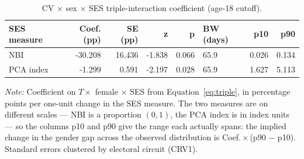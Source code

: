 \begin{table}
\caption{CV $\times$ sex $\times$ SES triple-interaction coefficient (age-18 cutoff).}
\label{tab:triple_T18}
\begin{tabular}{lrrrrlrr}
\toprule
SES measure & Coef. (pp) & SE (pp) & z & p & BW (days) & p10 & p90 \\
\midrule
NBI & -30.208 & 16.436 & -1.838 & 0.066 & 65.9 & 0.026 & 0.134 \\
PCA index & -1.299 & 0.591 & -2.197 & 0.028 & 65.9 & 1.627 & 5.113 \\
\bottomrule
\end{tabular}
\par\vspace{0.6em}
{\footnotesize\begin{minipage}{\linewidth}\emph{Note:} Coefficient on $T \times$ female $\times$ SES from Equation~\ref{eq:triple}, in percentage points per one-unit change in the SES measure. The two measures are on different scales --- NBI is a proportion $(0,1)$, the PCA index is in index units --- so the columns p10 and p90 give the range each actually spans: the implied change in the gender gap across the observed distribution is Coef.\,$\times$\,(p90 $-$ p10). Standard errors clustered by electoral circuit (CRV1).\end{minipage}}
\end{table}
